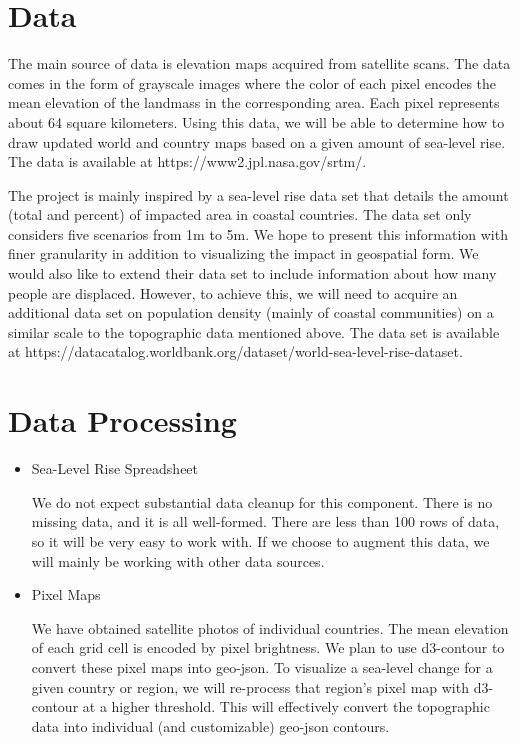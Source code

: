 \documentclass[12pt]{article}
\begin{document}
	\section{Data}
		The main source of data is elevation maps acquired from satellite scans.
		The data comes in the form of grayscale images where the color of each pixel encodes the mean elevation of the landmass in the corresponding area.
		Each pixel represents about 64 square kilometers.
		Using this data, we will be able to determine how to draw updated world and country maps based on a given amount of sea-level rise.
		The data is available at https://www2.jpl.nasa.gov/srtm/.

		The project is mainly inspired by a sea-level rise data set that details the amount (total and percent) of impacted area in coastal countries.
		The data set only considers five scenarios from 1m to 5m.
		We hope to present this information with finer granularity in addition to visualizing the impact in geospatial form.
		We would also like to extend their data set to include information about how many people are displaced.
		However, to achieve this, we will need to acquire an additional data set on population density (mainly of coastal communities) on a similar scale to the topographic data mentioned above.
		The data set is available at https://datacatalog.worldbank.org/dataset/world-sea-level-rise-dataset.

	\section{Data Processing}
		\begin{itemize}
			\item
				Sea-Level Rise Spreadsheet

				We do not expect substantial data cleanup for this component.
				There is no missing data, and it is all well-formed.
				There are less than 100 rows of data, so it will be very easy to work with.
				If we choose to augment this data, we will mainly be working with other data sources.

			\item
				Pixel Maps

				We have obtained satellite photos of individual countries.
				The mean elevation of each grid cell is encoded by pixel brightness.
				We plan to use d3-contour to convert these pixel maps into geo-json.
				To visualize a sea-level change for a given country or region, we will re-process that region's pixel map with d3-contour at a higher threshold.
				This will effectively convert the topographic data into individual (and customizable) geo-json contours.

		\end{itemize}
\end{document}
